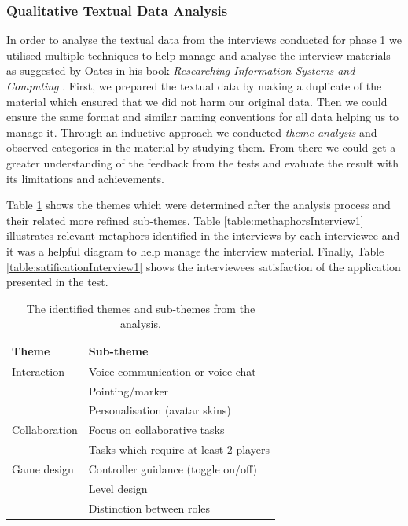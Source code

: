 \subsubsection{Qualitative Textual Data Analysis}
In order to analyse the textual data from the interviews conducted for phase 1 we utilised multiple techniques to help manage and analyse the interview materials as suggested by Oates in his book \textit{Researching Information Systems and Computing } \cite{oates2005researching}. First, we prepared the textual data by making a duplicate of the material which ensured that we did not harm our original data. Then we could ensure the same format and similar naming conventions for all data helping us to manage it. Through an inductive approach \cite{oates2005researching} we conducted \textit{theme analysis} and observed categories in the material by studying them. From there we could get a greater understanding of the feedback from the tests and evaluate the result with its limitations and achievements.

Table \ref{table:themesInterview1} shows the themes which were determined after the analysis process and their related more refined sub-themes.  Table \ref{table:methaphorsInterview1} illustrates relevant metaphors identified in the interviews by each interviewee and it was a helpful diagram to help manage the interview material. Finally, Table \ref{table:satificationInterview1} shows the interviewees satisfaction of the application presented in the test.     

\begin{table}[!h]
      \centering
        \begin{tabular}{ll}
        \toprule
        Theme & Sub-theme \\
        \midrule
        Interaction & Voice communication or voice chat\\
        & Pointing/marker \\\vspace{0.2cm}
        & Personalisation (avatar skins) \\
        Collaboration & Focus on collaborative tasks \\\vspace{0.2cm}
        & Tasks which require at least 2 players \\
        Game design & Controller guidance (toggle on/off)\\
        & Level design\\
        & Distinction between roles\\
        \bottomrule
        \end{tabular}
        \caption{The identified themes and sub-themes from the analysis.}
        \label{table:themesInterview1}
\end{table}



